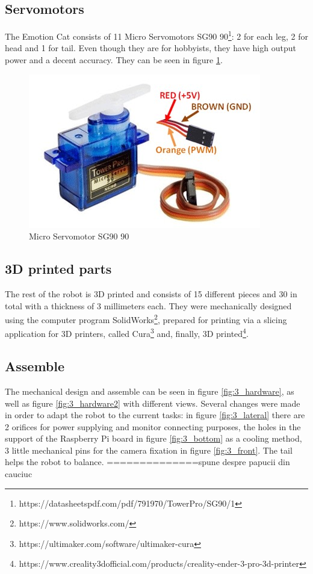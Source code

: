 \documentclass[runningheads,a4paper,12pt]{report}
\begin{document}
\subsection*{Servomotors}
The Emotion Cat consists of 11 Micro Servomotors SG90 90\textdegree\footnote{https://datasheetspdf.com/pdf/791970/TowerPro/SG90/1}: 2 for each leg, 2 for head and 1 for tail. Even though they are for hobbyists, they have high output power and a decent accuracy. They can be seen in figure \ref{fig:servo}.

\begin{figure}
	\centering

  	\includegraphics[width=.6\linewidth]{./images/3_servo}\hfill

    \caption{Micro Servomotor SG90 90\textdegree}  
    \label{fig:servo}
\end{figure}

\subsection*{3D printed parts}
The rest of the robot is 3D printed and consists of 15 different pieces and 30 in total with a thickness of 3 millimeters each. They were mechanically designed using the computer program SolidWorks\footnote{https://www.solidworks.com/}, prepared for printing via a slicing application for 3D printers, called Cura\footnote{https://ultimaker.com/software/ultimaker-cura} and, finally, 3D printed\footnote{https://www.creality3dofficial.com/products/creality-ender-3-pro-3d-printer}.  

\subsection*{Assemble}
The mechanical design and assemble can be seen in figure \ref{fig:3_hardware}, as well as figure \ref{fig:3_hardware2} with different views. Several changes were made in order to adapt the robot to the current tasks: in figure \ref{fig:3_lateral} there are 2 orifices for power supplying and monitor connecting purposes, the holes in the support of the Raspberry Pi board in figure \ref{fig:3_bottom} as a cooling method, 3 little mechanical pins for the camera fixation in figure \ref{fig:3_front}. The tail helps the robot to balance.
==============spune despre papucii din cauciuc
\end{document}

